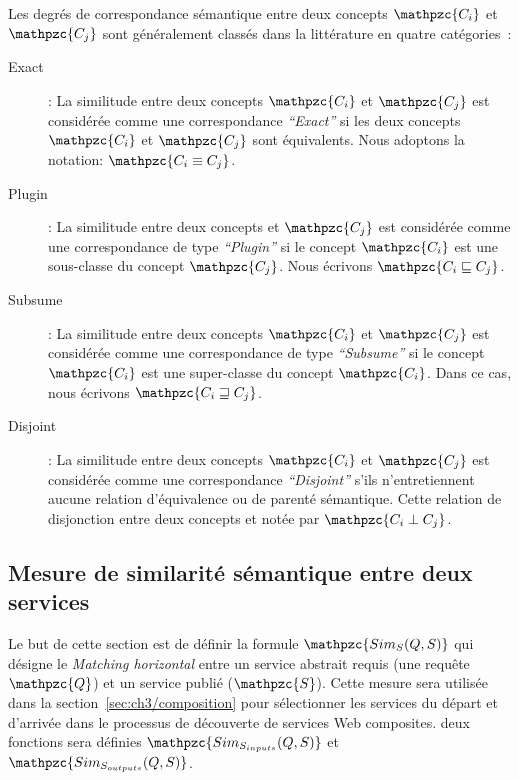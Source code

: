 
Les degrés de correspondance sémantique entre deux concepts
$\mathpzc{C_i}$ et $\mathpzc{C_j}$ sont généralement classés dans la
littérature en quatre catégories~\cite{paolucci2002semantic}:\medskip

\begin{description}
\item[Exact]: La similitude entre deux concepts $\mathpzc{C_i}$ et
  $\mathpzc{C_j}$ est considérée comme une correspondance
  \emph{``Exact''} si les deux concepts $\mathpzc{C_i}$ et
  $\mathpzc{C_j}$ sont équivalents. Nous adoptons la notation: {\large
    $\mathpzc{C_i \equiv C_j}$}.\medskip

\item[Plugin]: La similitude entre deux concepts et $\mathpzc{C_j}$
  est considérée comme une correspondance de type \emph{``Plugin''} si
  le concept $\mathpzc{C_i}$ est une sous-classe du concept
  $\mathpzc{C_j}$. Nous écrivons {\large
    $\mathpzc{C_i \sqsubseteq C_j}$}.\medskip

\item[Subsume]: La similitude entre deux concepts $\mathpzc{C_i}$ et
  $\mathpzc{C_j}$ est considérée comme une correspondance de type
  \emph{``Subsume''} si le concept $\mathpzc{C_i}$ est une
  super-classe du concept $\mathpzc{C_i}$. Dans ce cas, nous écrivons
  {\large $\mathpzc{C_i \sqsupseteq C_j}$}.\medskip

\item[Disjoint]: La similitude entre deux concepts $\mathpzc{C_i}$ et
  $\mathpzc{C_j}$ est considérée comme une correspondance
  \emph{``Disjoint''} s'ils n'entretiennent aucune relation
  d'équivalence ou de parenté sémantique. Cette relation de
  disjonction entre deux concepts et notée par {\large
    $\mathpzc{C_i \perp C_j}$}.\medskip
\end{description}



\newpage
\subsection{Mesure de similarité sémantique entre deux services}
\label{sec:matching-sims}

Le but de cette section est de définir la formule {\large
  $\mathpzc{Sim_S(Q,S)}$} qui désigne le \emph{Matching horizontal}
entre un service abstrait requis (une requête $\mathpzc{Q}$) et un
service publié ($\mathpzc{S}$). Cette mesure sera utilisée dans la
section~\ref{sec:ch3/composition} pour sélectionner les services du
départ et d'arrivée dans le processus de découverte de services Web
composites. deux fonctions sera définies {\large
  $\mathpzc{Sim_{S_{inputs}}(Q,S)}$} et {\large
  $\mathpzc{Sim_{S_{outputs}}(Q,S)}$}.


